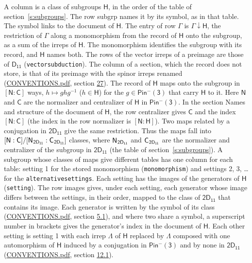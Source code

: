 \documentclass[10pt,a4paper]{article}
\numberwithin{equation}{section}
\newcommand{\grp}[1]{\mathsf{#1}}
\newcommand{\grpindex}[2]{[#1 : #2]}
\newcommand{\restr}[2]{#1\!\downarrow#2}
\newcommand{\hairsp}{\mkern1mu}
\begin{document}
A column is a class of subgroups $\grp{H}$, in the order of the table of section~\ref{s:subgroups}. The row subgrp names it by its symbol, as in that table. The symbol links to the document of $\grp{H}$. The entry of row $\Gamma$ is $\restr{\Gamma}{\grp{H}}$, the restriction of $\Gamma$ along a monomorphism from the record of $\grp{H}$ onto the subgroup, as a sum of the irreps of $\grp{H}$. The monomorphism identifies the subgroup with its record, and $\grp{H}$ names both. The rows of the vector irreps of a preimage are those of \href{../../../rotation/data/pdf/D11.pdf}{$\grp{D_{11}}$} (\texttt{vectorsubduction}). The column of a section, which the record does not store, is that of its preimage with the spinor irreps renamed (\href{../../CONVENTIONS.pdf}{CONVENTIONS.pdf}, section \href{../../CONVENTIONS.pdf\#conv.27}{27}). \label{n:group.normalizer.o3}\label{n:group.centralizer.o3}\label{n:element.h}The record of $\grp{H}$ maps onto the subgroup in $\grpindex{\grp{N}}{\grp{C}}$ ways, $h \mapsto g h g^{-1}$ ($h \in \grp{H}$) for the $g \in \grp{Pin^{-}(3)}$ that carry $\grp{H}$ to it. Here $\grp{N}$ and $\grp{C}$ are the normalizer and centralizer of $\grp{H}$ in \href{Pinminus3.pdf}{$\grp{Pin^{-}(3)}$}. In the section Names and structure of the document of $\grp{H}$, the row centralizer gives $\grp{C}$ and the index $\grpindex{\grp{N}}{\grp{C}}$ (the index in the row normalizer is $\grpindex{\grp{N}}{\grp{H}}$). Two maps related by a conjugation in $\grp{2D_{11}}$ give the same restriction. Thus the maps fall into $\grpindex{\grp{N}}{\grp{C}}/\grpindex{\grp{N}_{\hairsp \grp{2D_{11}}}}{\grp{C}_{\hairsp \grp{2D_{11}}}}$ classes, where $\grp{N}_{\hairsp \grp{2D_{11}}}$ and $\grp{C}_{\hairsp \grp{2D_{11}}}$ are the normalizer and centralizer of the subgroup in $\grp{2D_{11}}$ (the table of section~\ref{s:subgroups}). \label{n:head.setting}A subgroup whose classes of maps give different tables has one column for each table: setting 1 for the stored monomorphism (\texttt{monomorphism}) and settings 2, 3, \dots{} for the \texttt{alternativesettings}. Each setting has the images of the generators of $\grp{H}$ (\texttt{setting}). \label{n:head.images}The row images gives, under each setting, each generator whose image differs between the settings, in their order, mapped to the class of $\grp{2D_{11}}$ that contains its image. Each generator is written by the symbol of its class (\href{../../CONVENTIONS.pdf}{CONVENTIONS.pdf}, section \href{../../../rotation/CONVENTIONS.pdf\#conv.5.1}{5.1}), and where two share a symbol, a superscript number in brackets gives the generator's index in the document of $\grp{H}$. \label{n:irrep.Delta}Each other setting is setting 1 with each irrep $\Lambda$ of $\grp{H}$ replaced by $\Lambda$ composed with one automorphism of $\grp{H}$ induced by a conjugation in \href{Pinminus3.pdf}{$\grp{Pin^{-}(3)}$} and by none in $\grp{2D_{11}}$ (\href{../../CONVENTIONS.pdf}{CONVENTIONS.pdf}, section \href{../../../rotation/CONVENTIONS.pdf\#conv.12.1}{12.1}).
\end{document}
